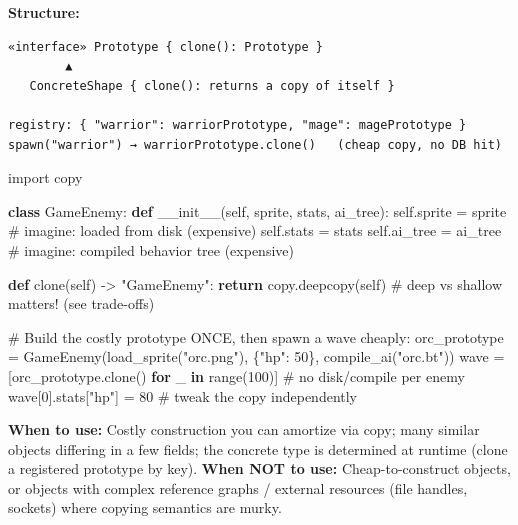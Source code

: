 \documentclass[11pt]{article}
\newenvironment{Shaded}{\begin{snugshade}}{\end{snugshade}}
\newcommand{\BuiltInTok}[1]{\textcolor[rgb]{0.50,0.55,0.55}{#1}}
\newcommand{\CommentTok}[1]{\textcolor[rgb]{0.48,0.49,0.49}{#1}}
\newcommand{\ControlFlowTok}[1]{\textcolor[rgb]{0.99,0.74,0.29}{\textbf{#1}}}
\newcommand{\DecValTok}[1]{\textcolor[rgb]{0.96,0.45,0.00}{#1}}
\newcommand{\FunctionTok}[1]{\textcolor[rgb]{0.56,0.27,0.68}{#1}}
\newcommand{\ImportTok}[1]{\textcolor[rgb]{0.15,0.68,0.38}{#1}}
\newcommand{\KeywordTok}[1]{\textcolor[rgb]{0.81,0.81,0.76}{\textbf{#1}}}
\newcommand{\NormalTok}[1]{\textcolor[rgb]{0.81,0.81,0.76}{#1}}
\newcommand{\OperatorTok}[1]{\textcolor[rgb]{0.81,0.81,0.76}{#1}}
\newcommand{\StringTok}[1]{\textcolor[rgb]{0.96,0.31,0.31}{#1}}
\newcommand{\VariableTok}[1]{\textcolor[rgb]{0.15,0.68,0.68}{#1}}
\begin{document}
\textbf{Structure:}

\setcodelang{}

\begin{verbatim}
«interface» Prototype { clone(): Prototype }
        ▲
   ConcreteShape { clone(): returns a copy of itself }

registry: { "warrior": warriorPrototype, "mage": magePrototype }
spawn("warrior") → warriorPrototype.clone()   (cheap copy, no DB hit)
\end{verbatim}


\begin{Shaded}
\begin{Highlighting}[]
\ImportTok{import}\NormalTok{ copy}

\KeywordTok{class}\NormalTok{ GameEnemy:}
    \KeywordTok{def} \FunctionTok{\_\_init\_\_}\NormalTok{(}\VariableTok{self}\NormalTok{, sprite, stats, ai\_tree):}
        \VariableTok{self}\NormalTok{.sprite }\OperatorTok{=}\NormalTok{ sprite          }\CommentTok{\# imagine: loaded from disk (expensive)}
        \VariableTok{self}\NormalTok{.stats }\OperatorTok{=}\NormalTok{ stats}
        \VariableTok{self}\NormalTok{.ai\_tree }\OperatorTok{=}\NormalTok{ ai\_tree        }\CommentTok{\# imagine: compiled behavior tree (expensive)}

    \KeywordTok{def}\NormalTok{ clone(}\VariableTok{self}\NormalTok{) }\OperatorTok{{-}\textgreater{}} \StringTok{"GameEnemy"}\NormalTok{:}
        \ControlFlowTok{return}\NormalTok{ copy.deepcopy(}\VariableTok{self}\NormalTok{)    }\CommentTok{\# deep vs shallow matters! (see trade{-}offs)}

\CommentTok{\# Build the costly prototype ONCE, then spawn a wave cheaply:}
\NormalTok{orc\_prototype }\OperatorTok{=}\NormalTok{ GameEnemy(load\_sprite(}\StringTok{"orc.png"}\NormalTok{), \{}\StringTok{"hp"}\NormalTok{: }\DecValTok{50}\NormalTok{\}, compile\_ai(}\StringTok{"orc.bt"}\NormalTok{))}
\NormalTok{wave }\OperatorTok{=}\NormalTok{ [orc\_prototype.clone() }\ControlFlowTok{for}\NormalTok{ \_ }\KeywordTok{in} \BuiltInTok{range}\NormalTok{(}\DecValTok{100}\NormalTok{)]   }\CommentTok{\# no disk/compile per enemy}
\NormalTok{wave[}\DecValTok{0}\NormalTok{].stats[}\StringTok{"hp"}\NormalTok{] }\OperatorTok{=} \DecValTok{80}                              \CommentTok{\# tweak the copy independently}
\end{Highlighting}
\end{Shaded}

\textbf{When to use:} Costly construction you can amortize via copy; many similar objects differing in a few fields; the concrete type is determined at runtime (clone a registered prototype by key). \textbf{When NOT to use:} Cheap-to-construct objects, or objects with complex reference graphs / external resources (file handles, sockets) where copying semantics are murky.
\end{document}

